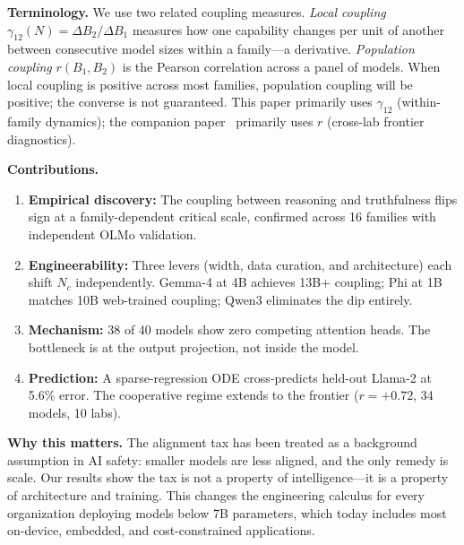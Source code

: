 \documentclass{article}
\begin{document}
\noindent\textbf{Terminology.}
We use two related coupling measures.
\emph{Local coupling} $\gamma_{12}(N) = \Delta B_2 / \Delta B_1$ measures how one capability
changes per unit of another between consecutive model sizes within a family---a derivative.
\emph{Population coupling} $r(B_1, B_2)$ is the Pearson correlation across a panel of models.
When local coupling is positive across most families, population coupling will be positive;
the converse is not guaranteed.
This paper primarily uses $\gamma_{12}$ (within-family dynamics);
the companion paper~\cite{amin2026growing} primarily uses $r$
(cross-lab frontier diagnostics).

\noindent\textbf{Contributions.}
\begin{enumerate}[nosep,leftmargin=*]
  \item \textbf{Empirical discovery:} The coupling between reasoning and truthfulness
        flips sign at a family-dependent critical scale,
        confirmed across 16 families with independent OLMo validation.
  \item \textbf{Engineerability:} Three levers (width, data curation, and architecture) each
        shift $N_c$ independently. Gemma-4 at 4B achieves 13B+ coupling;
        Phi at 1B matches 10B web-trained coupling; Qwen3 eliminates the dip entirely.
  \item \textbf{Mechanism:} 38 of 40 models show zero competing attention heads.
        The bottleneck is at the output projection, not inside the model.
  \item \textbf{Prediction:} A sparse-regression ODE cross-predicts held-out Llama-2 at 5.6\% error.
        The cooperative regime extends to the frontier ($r = +0.72$, 34 models, 10 labs).
\end{enumerate}

\begin{center}
\end{center}

\noindent\textbf{Why this matters.}
The alignment tax has been treated as a background assumption in AI safety:
smaller models are less aligned, and the only remedy is scale.
Our results show the tax is not a property of intelligence---it is a
property of architecture and training.
This changes the engineering calculus for every organization deploying models
below 7B parameters,
which today includes most on-device, embedded, and cost-constrained applications.
\end{document}
